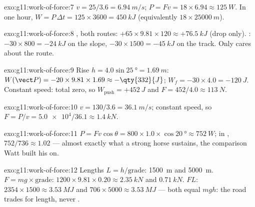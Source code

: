 \begin{solution}{exo:g11:work-of-force:7}
$v = 25/3.6 = \qty{6.94}{m/s}$; $P = Fv = 18 \times 6.94 \approx
\qty{125}{W}$. In one hour, $W = P\,\Delta t = 125 \times 3600 =
\qty{450}{kJ}$ (equivalently $18 \times \qty{25000}{m}$).
\end{solution}

\begin{solution}{exo:g11:work-of-force:8}
, both routes: $+65 \times 9.81 \times 120 \approx
+\qty{76.5}{kJ}$ (drop only). : $-30 \times 800 =
-\qty{24}{kJ}$ on the slope, $-30 \times 1500 = -\qty{45}{kJ}$ on the
track. Only  cares about the route.
\end{solution}

\begin{solution}{exo:g11:work-of-force:9}
Rise $h = 4.0\sin\qty{25}{\degree} = \qty{1.69}{m}$:
$W(\vect P) = -20 \times 9.81 \times 1.69 \approx -\qty{332}{J}$;
$W_f = -30 \times 4.0 = -\qty{120}{J}$. Constant speed: total 
zero, so $W_{\text{push}} = +\qty{452}{J}$ and
$F = 452/4.0 \approx \qty{113}{N}$.
\end{solution}

\begin{solution}{exo:g11:work-of-force:10}
$v = 130/3.6 = \qty{36.1}{m/s}$; constant speed, so
$F = P/v = \num{5.0e4}/36.1 \approx \qty{1.4}{kN}$.
\end{solution}

\begin{solution}{exo:g11:work-of-force:11}
$P = Fv\cos\theta = 800 \times 1.0 \times \cos\qty{20}{\degree}
\approx \qty{752}{W}$; in , $752/736 \approx \num{1.02}$ ---
almost exactly what a strong horse sustains, the comparison Watt
built his  on.
\end{solution}

\begin{solution}{exo:g11:work-of-force:12}
Lengths $L = h/\text{grade}$: \qty{1500}{m} and \qty{5000}{m}. 
$F = mg \times \text{grade}$: $1200 \times 9.81 \times 0.20 \approx
\qty{2.35}{kN}$ and $\qty{0.71}{kN}$.  $FL$: $2354 \times 1500
\approx \qty{3.53}{MJ}$ and $706 \times 5000 \approx \qty{3.53}{MJ}$
--- both equal $mgh$: the road trades  for length, never .
\end{solution}

